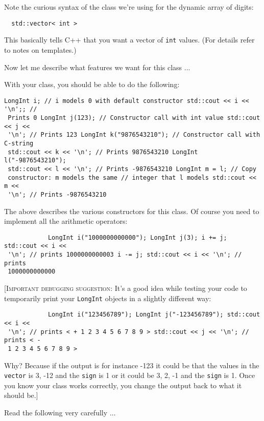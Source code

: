 Note the curious syntax of the class we're using for the dynamic array of
digits:

\verb!  std::vector< int >!

This basically tells C++ that you want a vector of \verb!int! values.  (For
details refer to notes on templates.)

Now let me describe what features we want for this class ...

With your class, you should be able to do the following:

\begin{Verbatim}[frame=single,fontsize=\footnotesize]
LongInt i; // i models 0 with default constructor std::cout << i << '\n';; //
 Prints 0 LongInt j(123); // Constructor call with int value std::cout << j <<
 '\n'; // Prints 123 LongInt k("9876543210"); // Constructor call with C-string
 std::cout << k << '\n'; // Prints 9876543210 LongInt l("-9876543210");
 std::cout << l << '\n'; // Prints -9876543210 LongInt m = l; // Copy
 constructor: m models the same // integer that l models std::cout << m <<
 '\n'; // Prints -9876543210
\end{Verbatim}

The above describes the various constructors for this class. Of course you need
to implement all the arithmetic operators:

\begin{Verbatim}
            LongInt i("1000000000000"); LongInt j(3); i += j; std::cout << i <<
 '\n'; // prints 1000000000003 i -= j; std::cout << i << '\n'; // prints
 1000000000000
\end{Verbatim}

[\textsc{Important debugging suggestion}: It's a good idea while testing your
  code to temporarily print your \verb!LongInt! objects in a slightly different
  way:

\begin{Verbatim}
            LongInt i("123456789"); LongInt j("-123456789"); std::cout << i <<
 '\n'; // prints < + 1 2 3 4 5 6 7 8 9 > std::cout << j << '\n'; // prints < -
 1 2 3 4 5 6 7 8 9 >
\end{Verbatim}

Why? Because if the output is for instance -123 it could be that the values in
the \verb!vector! is 3, -12 and the \verb!sign! is 1 or it could be 3, 2, -1
and the \verb!sign! is 1. Once you know your class works correctly, you change
the output back to what it should be.]

Read the following very carefully ...

